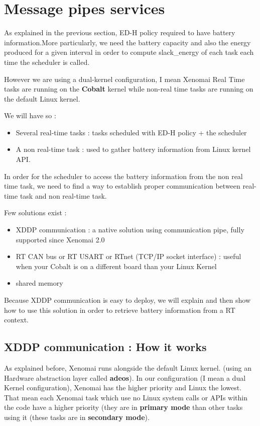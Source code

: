 \documentclass[12pt,hidelinks]{article}
\begin{document}
{\section{Message pipes services}
\vspace{4cm}
	As explained in the previous section, ED-H policy required to have battery information.More particularly, we need the battery capacity and also the energy produced for a given interval in order to compute slack\_energy of each task each time the scheduler is called.
	
	However we are using a dual-kernel configuration, I mean Xenomai Real Time tasks are running on the \textbf{Cobalt} kernel while non-real time tasks are running on the default Linux kernel.
	
	We will have so :
	\begin{itemize}
	    \item Several real-time tasks : tasks scheduled with ED-H policy + the scheduler
	    \item A non real-time task : used to gather battery information from Linux kernel API.
	\end{itemize}
	
	In order for the scheduler to access the battery information from the non real time task, we need to find a way to establish proper communication  between real-time task and non real-time task.
	
	Few solutions exist :\begin{itemize}
	    \item XDDP communication : a native solution using communication pipe, fully supported since Xenomai 2.0
	    \item RT CAN bus or RT USART or RTnet (TCP/IP socket interface) : useful when your Cobalt is on a different board than your Linux Kernel
	    \item shared memory
	\end{itemize}
	
	Because XDDP communication is easy to deploy, we will explain and then show how to use this solution in order to retrieve battery information from a RT context.
	
	\subsection{XDDP communication : How it works}
	
    As explained before, Xenomai runs alongside the default Linux kernel. (using an Hardware abstraction layer called \textbf{adeos}). In our configuration (I mean a dual Kernel configuration), Xenomai has the higher priority and Linux the lowest. That mean each Xenomai task which use no Linux system calls or APIs within the code have a higher priority (they are in \textbf{primary mode} than other tasks using it (these tasks are in \textbf{secondary mode}).
    
}
\end{document}
